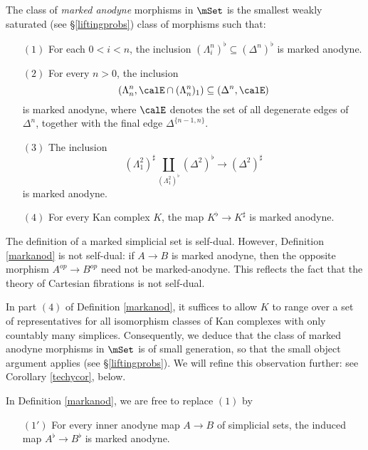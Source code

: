 \begin{definition}\label{markanod}
The class of {\em marked anodyne} morphisms in $\mSet$ is the smallest weakly saturated (see \S \ref{liftingprobs}) class of morphisms such that:
\begin{itemize}
\item[$(1)$] For each $0 < i < n$, the inclusion $(\Lambda^n_i)^{\flat} \subseteq (\Delta^n)^{\flat}$ is marked anodyne.

\item[$(2)$] For every $n >0$, the inclusion
$$ ( \Lambda^n_n, \calE \cap (\Lambda^n_n)_{1} ) \subseteq ( \Delta^n, \calE )$$
is marked anodyne, where $\calE$ denotes the set of all degenerate edges of $\Delta^n$, together with the final edge $\Delta^{ \{n-1,n\} }$.

\item[$(3)$] The inclusion
$$ (\Lambda^2_1)^{\sharp} \coprod_{ (\Lambda^2_1)^{\flat} } (\Delta^2)^{\flat} \rightarrow (\Delta^2)^{\sharp}$$ is marked anodyne.

\item[$(4)$] For every Kan complex $K$, the map $K^{\flat} \rightarrow K^{\sharp}$ is marked anodyne.
\end{itemize}
\end{definition}

\begin{remark}
The definition of a marked simplicial set is self-dual. However, Definition
\ref{markanod} is not self-dual: if $A \rightarrow B$ is
marked anodyne, then the opposite morphism $A^{op} \rightarrow B^{op}$ need not be marked-anodyne. This reflects the fact that the theory of Cartesian fibrations is not self-dual.
\end{remark}

\begin{remark}
In part $(4)$ of Definition \ref{markanod}, it suffices to allow $K$ to range over a set of representatives for all isomorphism classes of Kan complexes with only countably many simplices. Consequently, we deduce that the class of marked anodyne morphisms in $\mSet$ is of small generation, so that the small object argument applies (see \S \ref{liftingprobs}). We will refine this observation further: see Corollary \ref{techycor}, below.
\end{remark}

\begin{remark}\label{sillin}
In Definition \ref{markanod}, we are free to replace $(1)$ by
\begin{itemize}
\item[$(1')$] For every inner anodyne map $A \rightarrow B$ of simplicial sets, the
induced map $A^{\flat} \rightarrow B^{\flat}$ is marked anodyne.
\end{itemize}
\end{remark}


